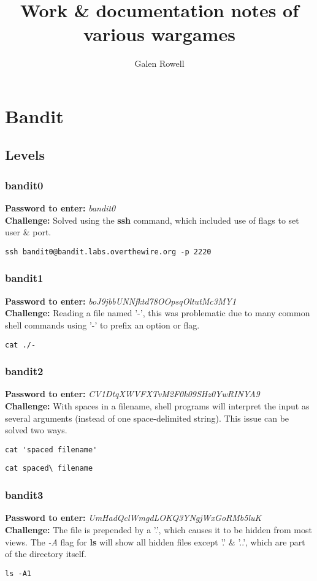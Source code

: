 \documentclass[a4paper]{article}
\newcommand{\pass}[1]{\textbf{Password to enter:} \textit{#1}\\}
\newcommand{\chall}{\textbf{Challenge:} }
\begin{document}
\title{Work \& documentation notes of various wargames}
\author{Galen Rowell}
\maketitle


\section{Bandit}
\subsection{Levels}

\subsubsection{bandit0}
\pass{bandit0}
\chall Solved using the \textbf{ssh} command, which included use of flags to set user \& port.
\begin{lstlisting}
ssh bandit0@bandit.labs.overthewire.org -p 2220
\end{lstlisting}

\subsubsection{bandit1}
\pass{boJ9jbbUNNfktd78OOpsqOltutMc3MY1}
\chall Reading a file named '-', this was problematic due to many common shell commands using '-' to prefix an option or flag.
\begin{lstlisting}
cat ./-
\end{lstlisting}

\subsubsection{bandit2}
\pass{CV1DtqXWVFXTvM2F0k09SHz0YwRINYA9}
\chall With spaces in a filename, shell programs will interpret the input as several arguments (instead of one space-delimited string). This issue can be solved two ways.
\begin{lstlisting}
cat 'spaced filename'
\end{lstlisting}
\begin{lstlisting}
cat spaced\ filename
\end{lstlisting}

\subsubsection{bandit3}
\pass{UmHadQclWmgdLOKQ3YNgjWxGoRMb5luK}
\chall The file is prepended by a '.', which causes it to be hidden from most views. The \textit{-A} flag for \textbf{ls} will show all hidden files except '.' \& '..', which are part of the directory itself.
\begin{lstlisting}
ls -A1
\end{lstlisting}
\end{document}
